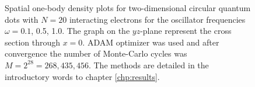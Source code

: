 \begin{landscape}
\begin{figure} [H]
		\caption{Spatial one-body density plots for two-dimensional circular quantum dots with $N=20$ interacting electrons for the oscillator frequencies $\omega=0.1$, 0.5, 1.0. The graph on the $yz$-plane represent the cross section through $x=0$. ADAM optimizer was used and after convergence the number of Monte-Carlo cycles was $M=2^{28}=268,435,456$. The methods are detailed in the introductory words to chapter \ref{chp:results}.}%
		\label{fig:OB2_interaction_20P}
	\end{figure}
	\begin{figure} [H]%
		\centering
		\captionsetup[subfigure]{labelformat=empty}
		\captionsetup{width=0.9\hsize}
		\hspace{0.1cm}
		\hspace{-0.0cm}
		\hspace{-0.0cm}
		\hspace{-0.0cm}
		\\ [-0.3cm]
		

\end{figure}
\end{landscape}
